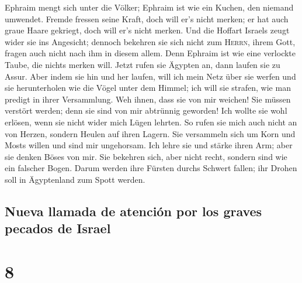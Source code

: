  Ephraim mengt sich unter die Völker; Ephraim ist wie ein
Kuchen, den niemand umwendet.  Fremde fressen seine Kraft,
doch will er's nicht merken; er hat auch graue Haare gekriegt, doch will
er's nicht merken.  Und die Hoffart Israels zeugt wider
sie ins Angesicht; dennoch bekehren sie sich nicht zum \textsc{Herrn},
ihrem Gott, fragen auch nicht nach ihm in diesem allem. 
Denn Ephraim ist wie eine verlockte Taube, die nichts merken will. Jetzt
rufen sie Ägypten an, dann laufen sie zu Assur.  Aber
indem sie hin und her laufen, will ich mein Netz über sie werfen und sie
herunterholen wie die Vögel unter dem Himmel; ich will sie strafen, wie
man predigt in ihrer Versammlung.  Weh ihnen, dass sie
von mir weichen! Sie müssen verstört werden; denn sie sind von mir
abtrünnig geworden! Ich wollte sie wohl erlösen, wenn sie nicht wider
mich Lügen lehrten.  So rufen sie mich auch nicht an von
Herzen, sondern Heulen auf ihren Lagern. Sie versammeln sich um Korn und
Mosts willen und sind mir ungehorsam.  Ich lehre sie und
stärke ihren Arm; aber sie denken Böses von mir.  Sie
bekehren sich, aber nicht recht, sondern sind wie ein falscher Bogen.
Darum werden ihre Fürsten durchs Schwert fallen; ihr Drohen soll in
Ägyptenland zum Spott werden.

\hypertarget{nueva-llamada-de-atenciuxf3n-por-los-graves-pecados-de-israel}{%
\subsection{Nueva llamada de atención por los graves pecados de
Israel}\label{nueva-llamada-de-atenciuxf3n-por-los-graves-pecados-de-israel}}

\hypertarget{section-7}{%
\section{8}\label{section-7}}

